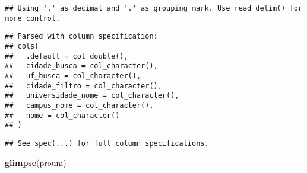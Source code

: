 \documentclass[
]{article}
\newenvironment{Shaded}{\begin{snugshade}}{\end{snugshade}}
\newcommand{\KeywordTok}[1]{\textcolor[rgb]{0.13,0.29,0.53}{\textbf{#1}}}
\newcommand{\NormalTok}[1]{#1}
\begin{document}
\begin{verbatim}
## Using ',' as decimal and '.' as grouping mark. Use read_delim() for more control.
\end{verbatim}

\begin{verbatim}
## Parsed with column specification:
## cols(
##   .default = col_double(),
##   cidade_busca = col_character(),
##   uf_busca = col_character(),
##   cidade_filtro = col_character(),
##   universidade_nome = col_character(),
##   campus_nome = col_character(),
##   nome = col_character()
## )
\end{verbatim}

\begin{verbatim}
## See spec(...) for full column specifications.
\end{verbatim}

\begin{Shaded}
\begin{Highlighting}[]
\KeywordTok{glimpse}\NormalTok{(prouni)}
\end{Highlighting}
\end{Shaded}
\end{document}
